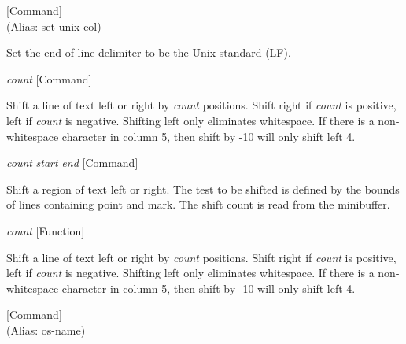 \vspace{1em}
\noindent
{}
\usebox{\funcname}
 \hfill [Command]\\%
 (Alias: set-unix-eol)

\begin{doc-string}
Set the end of line delimiter to be the Unix standard (LF).
\end{doc-string}

\vspace{1em}
\noindent
{}
\usebox{\funcname}\emph{count}
 \hfill [Command]

\begin{doc-string}
Shift a line of text left or right by \emph{count} positions.  Shift right
if \emph{count} is positive, left if \emph{count} is negative.  Shifting left only
eliminates whitespace.  If there is a non-whitespace character in column
5, then shift by -10 will only shift left 4.
\end{doc-string}

\vspace{1em}
\noindent
{}
\usebox{\funcname}\emph{count} \emph{start} \emph{end}
 \hfill [Command]

\begin{doc-string}
Shift a region of text left or right.  The test to be shifted is defined
by the bounds of lines containing point and mark.  The shift count is
read from the minibuffer.
\end{doc-string}

\vspace{1em}
\noindent
{}
\usebox{\funcname}\emph{count}
 \hfill [Function]

\begin{doc-string}
Shift a line of text left or right by \emph{count} positions.  Shift right
if \emph{count} is positive, left if \emph{count} is negative.  Shifting left only
eliminates whitespace.  If there is a non-whitespace character in column
5, then shift by -10 will only shift left 4.
\end{doc-string}

\vspace{1em}
\noindent
{}
\usebox{\funcname}
 \hfill [Command]\\%
 (Alias: os-name)

